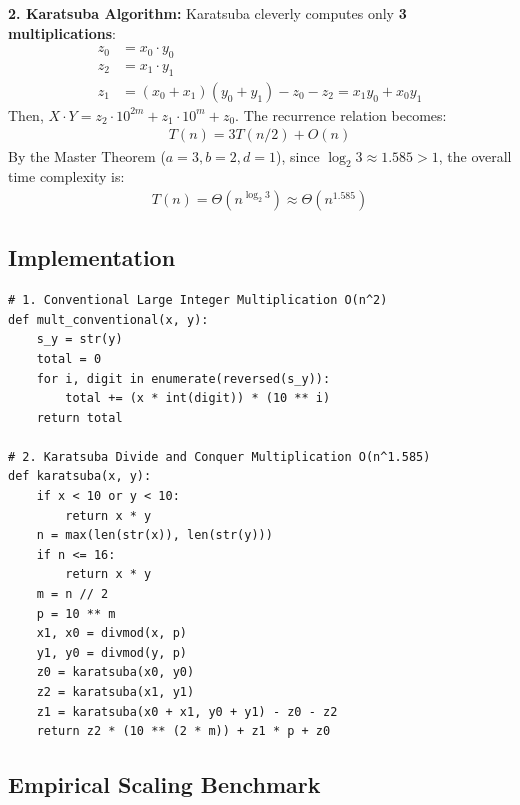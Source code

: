 \documentclass[12pt]{article}
\begin{document}
\textbf{2. Karatsuba Algorithm:} Karatsuba cleverly computes only \textbf{3 multiplications}:
\begin{align*}
    z_0 &= x_0 \cdot y_0 \\
    z_2 &= x_1 \cdot y_1 \\
    z_1 &= (x_0 + x_1)(y_0 + y_1) - z_0 - z_2 = x_1 y_0 + x_0 y_1
\end{align*}
Then, $X \cdot Y = z_2 \cdot 10^{2m} + z_1 \cdot 10^m + z_0$.
The recurrence relation becomes:
\begin{align*}
    T(n) = 3T(n/2) + O(n)
\end{align*}
By the Master Theorem ($a=3, b=2, d=1$), since $\log_2 3 \approx 1.585 > 1$, the overall time complexity is:
\begin{align*}
    T(n) = \Theta\left(n^{\log_2 3}\right) \approx \Theta\left(n^{1.585}\right)
\end{align*}

\subsection{Implementation}
\begin{lstlisting}[style=code]
# 1. Conventional Large Integer Multiplication O(n^2)
def mult_conventional(x, y):
    s_y = str(y)
    total = 0
    for i, digit in enumerate(reversed(s_y)):
        total += (x * int(digit)) * (10 ** i)
    return total

# 2. Karatsuba Divide and Conquer Multiplication O(n^1.585)
def karatsuba(x, y):
    if x < 10 or y < 10:
        return x * y
    n = max(len(str(x)), len(str(y)))
    if n <= 16:
        return x * y
    m = n // 2
    p = 10 ** m
    x1, x0 = divmod(x, p)
    y1, y0 = divmod(y, p)
    z0 = karatsuba(x0, y0)
    z2 = karatsuba(x1, y1)
    z1 = karatsuba(x0 + x1, y0 + y1) - z0 - z2
    return z2 * (10 ** (2 * m)) + z1 * p + z0
\end{lstlisting}

\subsection{Empirical Scaling Benchmark}
\end{document}
